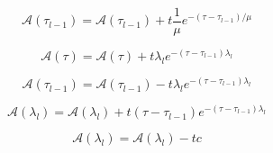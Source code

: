 \begin{equation}
\mathcal{A}(\tau_{l-1}) = \mathcal{A}(\tau_{l-1}) + t \frac{1}{\mu} e^{-(\tau - \tau_{l-1}) / \mu}
\label{eq:single_scattering-adjoint_of_tangent_linear-down-tau_l_m_1_a2}
\end{equation}

\begin{equation}
\mathcal{A}(\tau) = \mathcal{A}(\tau) + t \lambda_{l} e^{-(\tau - \tau_{l-1})\lambda_{l}}
\label{eq:single_scattering-adjoint_of_tangent_linear-down-tau_a3}
\end{equation}

\begin{equation}
\mathcal{A}(\tau_{l-1}) = \mathcal{A}(\tau_{l-1}) - t \lambda_{l} e^{-(\tau - \tau_{l-1})\lambda_{l}}
\label{eq:single_scattering-adjoint_of_tangent_linear-down-tau_l_m_1_a3}
\end{equation}

\begin{equation}
\mathcal{A}(\lambda_{l}) = \mathcal{A}(\lambda_{l}) + t (\tau - \tau_{l-1}) e^{-(\tau - \tau_{l-1}) \lambda_{l}}
\label{eq:single_scattering-adjoint_of_tangent_linear-up-lambda_l_a3}
\end{equation}

\begin{equation}
\mathcal{A}(\lambda_{l}) = \mathcal{A}(\lambda_{l}) - t c
\label{eq:single_scattering-adjoint_of_tangent_linear-down-lambda_l_a2}
\end{equation}
